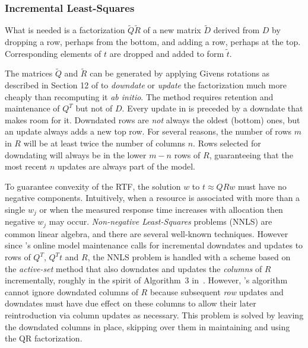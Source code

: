 \subsubsection*{Incremental Least-Squares}
What is needed is a factorization $\tilde{Q}\tilde{R}$ of a new matrix $\tilde{D}$
derived from $D$ by dropping a row, perhaps from the bottom,
and adding a row, perhaps at the top.
Corresponding elements of $t$ are dropped and added to form $\tilde{t}$.

The matrices $\tilde{Q}$ and $\tilde{R}$ can be generated by applying Givens rotations
as described in Section 12 of \cite{GoVL} to \emph{downdate} or \emph{update} the factorization
much more cheaply than recomputing it \emph{ab initio}.
The method requires retention and maintenance of $Q^T$ but not of $D$.
Every update in \pacora is preceded by a downdate that makes room for it.
Downdated rows are \emph{not} always the oldest (bottom) ones, but
an update always adds a new top row.
For several reasons, the number of rows $m$ in $R$
will be at least twice the number of columns $n$.
Rows selected for downdating will always be in the lower $m - n$ rows of $R$,
guaranteeing that the most recent $n$ updates are always part of the model.


To guarantee convexity of the RTF, the solution $w$ to $t \approx QRw$ must have no negative components.
Intuitively, when a resource is associated with more than a single $w_j$
or when the measured response time increases with allocation then negative $w_j$ may occur. \emph{Non-negative Least-Squares} problems (NNLS) are common linear algebra, and there are several well-known techniques\cite{ChPl}.
However since \pacora's online model maintenance calls for
incremental downdates and updates to rows of $Q^T$, $Q^Tt$ and $R$,
the NNLS problem is handled with a scheme
based on the \emph{active-set} method\cite{LaHa} that
also downdates and updates the \emph{columns} of $R$ incrementally,
roughly in the spirit of Algorithm~3 in~\cite{LuDu}.
However, \pacora's algorithm cannot ignore downdated columns of $R$
because subsequent \emph{row} updates and downdates must have due effect
on these columns to allow their later reintroduction via column updates as necessary.
This problem is solved by leaving the downdated columns in place,
skipping over them in maintaining and using the QR factorization.

